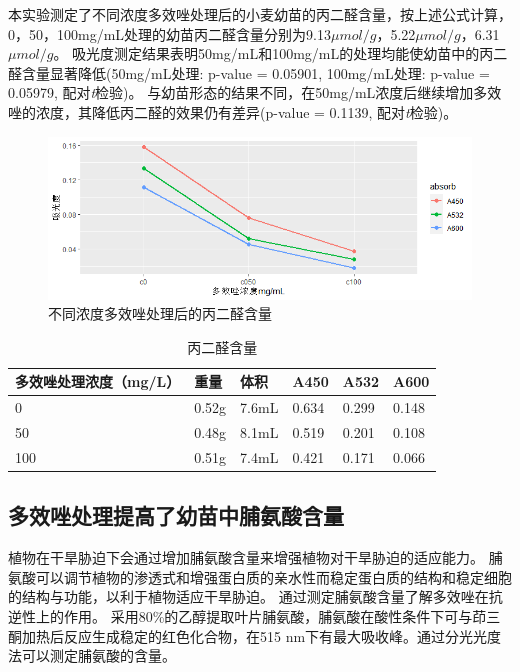 \documentclass[UTF8]{ctexart}
\begin{document}
    本实验测定了不同浓度多效唑处理后的小麦幼苗的丙二醛含量，按上述公式计算，0，50，100mg/mL处理的幼苗丙二醛含量分别为9.13$\mu mol/g$，5.22$\mu mol/g$，6.31$\mu mol/g$。
    吸光度测定结果表明50mg/mL和100mg/mL的处理均能使幼苗中的丙二醛含量显著降低(50mg/mL处理: p-value = 0.05901, 100mg/mL处理: p-value = 0.05979, 配对\textit{t}检验)。
    与幼苗形态的结果不同，在50mg/mL浓度后继续增加多效唑的浓度，其降低丙二醛的效果仍有差异(p-value = 0.1139, 配对\textit{t}检验)。

    \begin{figure}[!h]
        \centering
        \caption{不同浓度多效唑处理后的丙二醛含量}
        \setlength{\abovecaptionskip}{0pt}
        \includegraphics[scale=0.6]{bing.png}
    \end{figure}

    \begin{table}[!h]
        \centering
        \setlength{\abovecaptionskip}{0.cm}
        \caption{丙二醛含量}
        \begin{tabular}{llllll}
        \hline
        多效唑处理浓度（mg/L） & 重量    & 体积    & A450  & A532  & A600  \\ \hline
        0             & 0.52g & 7.6mL & 0.634 & 0.299 & 0.148 \\
        50            & 0.48g & 8.1mL & 0.519 & 0.201 & 0.108 \\
        100           & 0.51g & 7.4mL & 0.421 & 0.171 & 0.066 \\ \hline
        \end{tabular}
    \end{table}


    \subsection{多效唑处理提高了幼苗中脯氨酸含量}

    植物在干旱胁迫下会通过增加脯氨酸含量来增强植物对干旱胁迫的适应能力。
    脯氨酸可以调节植物的渗透式和增强蛋白质的亲水性而稳定蛋白质的结构和稳定细胞的结构与功能，以利于植物适应干旱胁迫。
    通过测定脯氨酸含量了解多效唑在抗逆性上的作用。
    采用80\%的乙醇提取叶片脯氨酸，脯氨酸在酸性条件下可与茚三酮加热后反应生成稳定的红色化合物，在515 nm下有最大吸收峰。通过分光光度法可以测定脯氨酸的含量。
\end{document}
